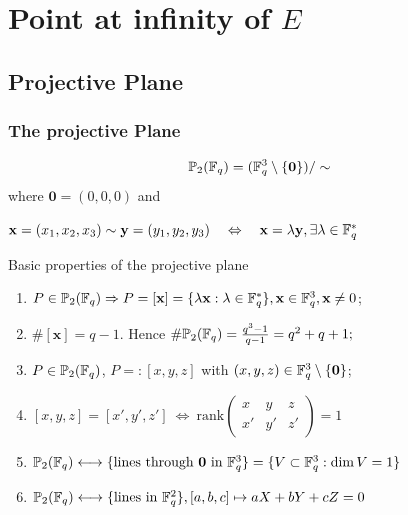 \documentclass[10pt,handout]{beamer} %
\begin{document}
\section{Point at infinity of \texorpdfstring{$E$}{E}}
\subsection{Projective Plane}
\begin{frame}
\frametitle{The projective Plane}

\begin{Definition}
$$\mathbb P_2(\mathbb F_q)=(\mathbb F_q^3\setminus\{\mathbf{0}\})/\sim$$
where $\mathbf{0}=(0,0,0)$ and
\centerline{$\mathbf{x}=(x_1,x_2,x_3)\sim \mathbf{y}=(y_1,y_2,y_3)\quad\Leftrightarrow\quad\mathbf{x}=\lambda\mathbf{y}, \exists\lambda\in\mathbb F_q^*$}
\end{Definition}\pause

\begin{beamerboxesrounded}[upper=block title example,lower=block body example,shadow=true]{Basic properties of the projective plane}
\begin{enumerate}[<+-| alert@+>]
 \item $P\in\mathbb P_2(\mathbb F_q) \Rightarrow P=[\mathbf{x}]=\{\lambda\mathbf{x}:\lambda\in\mathbb F_q^*\}, \mathbf{x}\in\mathbb F_q^3, \textbf{x}\neq0$;
 \item $\#[\mathbf{x}]=q-1$. Hence $\#\mathbb P_2(\mathbb F_q)=\frac{q^3-1}{q-1}=q^2+q+1;$
 \item $P\in \mathbb P_2(\mathbb F_q)$, $P=:[x,y,z]$ with $(x,y,z)\in \mathbb F_q^3\setminus\{\mathbf{0}\}$;
\item $[x,y,z]=[x',y',z']\ \Longleftrightarrow\ \text{rank}\begin{pmatrix}
                                 x&y&z\\ x'&y'&z'
                                \end{pmatrix}=1$
\item $\mathbb P_2(\mathbb F_q) \longleftrightarrow \{\text{lines through }\mathbf{0}\text{ in }\mathbb F_q^3\}= \{V\subset \mathbb F_q^3: \dim V=1\}$
\item $\mathbb P_2(\mathbb F_q) \longleftrightarrow \{\text{lines in }\mathbb F_q^2\}, [a,b,c]\mapsto aX+bY+cZ=0$
\end{enumerate}
\end{beamerboxesrounded}

\end{frame}
\end{document}
